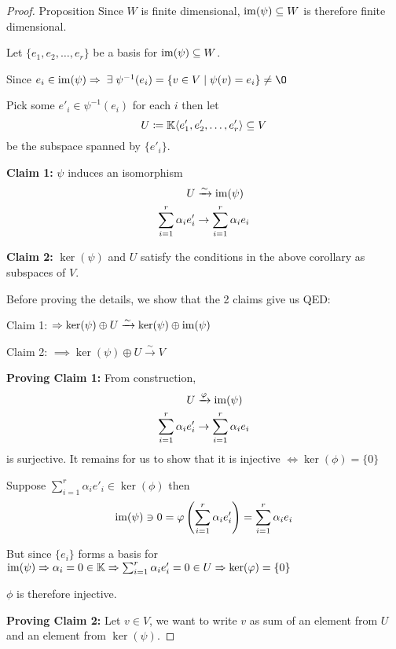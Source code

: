 \begin{proof} {Proposition}
    Since \(W\) is finite dimensional, \(\mathrm{im}(\psi) \subseteq W\) is therefore finite dimensional.

    Let \(\{e_1, e_2, \dots, e_r\}\) be a basis for \(\mathrm{im}(\psi) \subseteq W\).

    Since \(e_i \in \im(\psi) \implies \exists \psi^{-1}(e_i) = \{v \in V \mid \psi(v) = e_i\} \neq \O\)

    Pick some \(e'_i \in \psi^{-1}(e_i)\) for each \(i\) then let \[
    U \coloneq \mathbb{K}\langle e'_1, e'_2, \dots, e'_r\rangle \subseteq V
    \]
    be the subspace spanned by \(\{e'_i\}\).
    
    \textbf{Claim 1:} \(\psi\) induces an isomorphism 
    \begin{align*}
        U & \xrightarrow{\sim} \mathrm{im}(\psi) \\
        \sum_{i=1}^{r} \alpha_i e'_i & \to \sum_{i=1}^{r} \alpha_i e_i
    \end{align*}

    \textbf{Claim 2:} \(\ker(\psi)\) and \(U\) satisfy the conditions in the above corollary as subspaces of \(V\).

    Before proving the details, we show that the 2 claims give us QED:

    Claim 1: \(\Rightarrow \ker(\psi) \oplus U \xrightarrow{\sim} \ker(\psi) \oplus \mathrm{im}(\psi)\)
    
    Claim 2: \(\implies \ker(\psi) \oplus U \xrightarrow{\sim} V\) \qedhere

    \textbf{Proving Claim 1:} From construction, \begin{align*}
        U & \xrightarrow{\varphi} \mathrm{im}(\psi) \\
        \sum_{i=1}^{r} \alpha_i e'_i &\to \sum_{i=1}^{r} \alpha_i e_i
    \end{align*}
    is surjective. It remains for us to show that it is injective \(\Leftrightarrow \ker(\phi) = \{0\}\)

    Suppose \(\sum_{i=1}^{r} \alpha_i e'_i \in \ker(\phi)\) then \[
    \mathrm{im}(\psi) \ni 0 = \varphi\left(\sum_{i=1}^{r} \alpha_i e'_i\right) = \sum_{i=1}^{r} \alpha_i e_i
    \]

    But since \(\{e_i\}\) forms a basis for \(\mathrm{im}(\psi) \Rightarrow \alpha_i = 0 \in \mathbb{K} \Rightarrow \sum_{i=1}^{r} \alpha_i e'_i = 0 \in U \Rightarrow \ker(\varphi) = \{0\}\) 
    
    \(\phi\) is therefore injective.

    \textbf{Proving Claim 2:} Let \(v \in V\), we want to write \(v\) as sum of an element from \(U\) and an element from \(\ker(\psi)\).


\end{proof}
